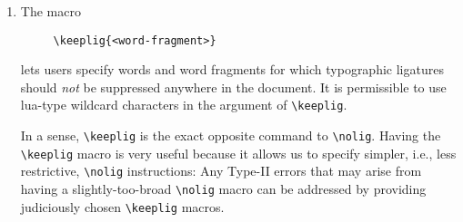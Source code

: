 \documentclass[12pt]{article}
\newcommand{\pkg}[1]{\textsf{#1}}
\newcommand{\opt}[1]{\texttt{#1}}
\newcommand{\cmmd}[1]{\texttt{\textbackslash #1}}
\begin{document}
\begin{enumerate}
If you study the \cmmd{nolig} instructions provided in the files \pkg{selnolig-german-patterns.sty} and \pkg{selnolig-english-patterns.sty}, you'll notice that there's some redundancy built into the \cmmd{nolig} rules. E.g., the German verb \enquote{auffahren} is noticed both by \Verb+\nolig{auff}{auf|f}+ and by \Verb+\nolig{ffahr}{f|fahr}+. This redundancy is there by design, because not all words that might fit the first pattern will also fit the second pattern, and vice versa.\footnote{For instance, the second \cmmd{nolig} instruction also catches words such as Golffahrten and Prüffahrten. } Listing the \emph{union} of all possible pairs of non-redundant rules would result in a rather large and unwieldy number of separate rules and slow down processing tremendously. Conversely, taking the \emph{intersection} of the two rules\textemdash in the present case, just the character pair \opt{ff}\textemdash would create ligature suppression rules that are far too broad. Building in some redundancy seems like a reasonable way to proceed in this field.

Observe also that the arguments of the \cmmd{nolig} command (as well as of the package's other user commands) are case-sensitive. 

\item The macro 
\begin{Verbatim}
     \keeplig{<word-fragment>}
\end{Verbatim}
lets users specify words and word fragments for which typographic ligatures should \emph{not} be suppressed anywhere in the document. It is permissible to use lua-type wildcard characters in the argument of \cmmd{keeplig}.

In a sense, \cmmd{keeplig} is the exact opposite command to \cmmd{nolig}. Having the \cmmd{keeplig} macro is very useful because it allows us to specify simpler, i.e., less restrictive, \cmmd{nolig} instructions: Any Type-II errors that may arise from having a slightly-too-broad \cmmd{nolig} macro can be addressed by providing judiciously chosen \cmmd{keeplig} macros. 


\end{enumerate}
\end{document}
